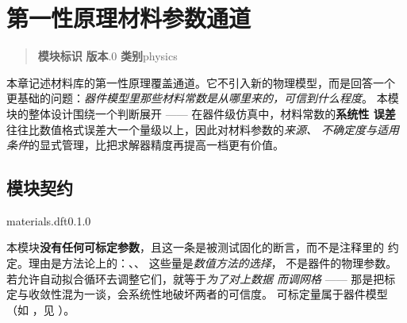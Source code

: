 
\chapter{第一性原理材料参数通道}
\label{ch:dft}

\begin{quote}
\small
\noindent\textbf{模块标识}\quad{}\qquad
\textbf{版本}.0\qquad
\textbf{类别}\quad physics
\end{quote}

\noindent
本章记述材料库的第一性原理覆盖通道。它不引入新的物理模型，而是回答一个
更基础的问题：\emph{器件模型里那些材料常数是从哪里来的，可信到什么程度}。
本模块的整体设计围绕一个判断展开 —— 在器件级仿真中，材料常数的\textbf{系统性
误差}往往比数值格式误差大一个量级以上，因此对材料参数的\emph{来源、
不确定度与适用条件}的显式管理，比把求解器精度再提高一档更有价值。

\section{模块契约}
\label{sec:dft-contract}

\begin{modulecard}{materials.dft}{0.1.0}
  \cardsep
\end{modulecard}

本模块\textbf{没有任何可标定参数}，且这一条是被测试固化的断言，而不是注释里的
约定。理由是方法论上的：、、
 这些量是\emph{数值方法的选择}，
不是器件的物理参数。若允许自动拟合循环去调整它们，就等于\emph{为了对上数据
而调网格} —— 那是把标定与收敛性混为一谈，会系统性地破坏两者的可信度。
可标定量属于器件模型（如 ，见 ）。

